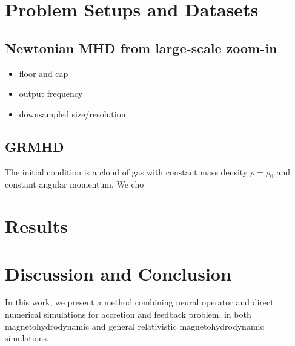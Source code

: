 \documentclass[%
 reprint,
 superscriptaddress,
 amsmath,amssymb,
 nofootinbib,
 prd,
]{revtex4-2}
\newcommand{\hyw}[1]{{\color{red}{[{#1}]}}}
\newcommand{\hywcom}[1]{{\color{purple}{[HYW: #1]}}}
\begin{document}
\section{Problem Setups and Datasets}
\label{sec:setup}

\subsection{Newtonian MHD from large-scale zoom-in}

\begin{itemize}
    \item floor and cap
    \item output frequency
    \item downsampled size/resolution
\end{itemize}

\subsection{GRMHD}
The initial condition is a cloud of gas with constant mass density $\rho=\rho_0$ and constant angular momentum. We cho






\section{Results}
\label{sec:results}



\section{Discussion and Conclusion}
\label{sec:conclusion}

\hywcom{Conclusions.}
In this work, we present a method combining neural operator and direct numerical simulations for accretion and feedback problem, in both magnetohydrodynamic and general relativistic magnetohydrodynamic simulations.
\end{document}
